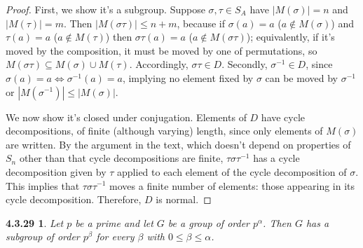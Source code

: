 \documentclass{article}
\newtheorem*{4.3.29}{4.3.29}
\begin{document}
\begin{proof}
  First, we show it's a subgroup.
  Suppose $\sigma, \tau \in S_{A}$ have $|M(\sigma)| = n$ and $|M(\tau)| = m$.
  Then $|M(\sigma\tau)| \leq n + m$, because if $\sigma(a) = a$ ($a \not\in M(\sigma)$) and $\tau(a) = a$ ($a \not\in M(\tau)$) then
  $\sigma\tau(a) = a$  ($a \not\in M(\sigma\tau)$);
  equivalently, if it's moved by the composition, it must be moved by one of permutations, so $M(\sigma\tau)\subseteq M(\sigma)\cup M(\tau)$.
  Accordingly, $\sigma\tau \in D$.
  Secondly, $\sigma^{-1} \in D$, since $\sigma(a) = a \Leftrightarrow \sigma^{-1}(a) = a$,
  implying no element fixed by $\sigma$ can be moved by $\sigma^{-1}$ or $|M(\sigma^{-1})| \leq |M(\sigma)|$.

  We now show it's closed under conjugation.
  Elements of $D$ have cycle decompositions, of finite (although varying) length, since only elements of $M(\sigma)$ are written.
  By the argument in the text, which doesn't depend on properties of $S_{n}$ other than that cycle decompositions are finite,
  $\tau\sigma\tau^{-1}$ has a cycle decomposition given by $\tau$ applied to each element of the cycle decomposition of $\sigma$.
  This implies that $\tau\sigma\tau^{-1}$ moves a finite number of elements: those appearing in its cycle decomposition.
  Therefore, $D$ is normal.
\end{proof}

\begin{4.3.29}
  Let $p$ be a prime and let $G$ be a group of order $p^{\alpha}$.
  Then $G$ has a subgroup of order $p^{\beta}$ for every $\beta$ with $0 \leq \beta \leq \alpha $.
\end{4.3.29}
\end{document}
